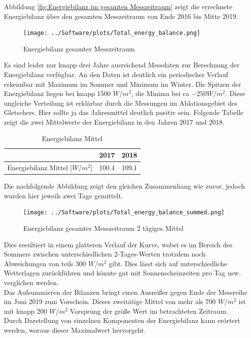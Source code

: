 \documentclass[12pt,a4paper]{article}
\begin{document}
Abbildung \ref{fig:Energiebilanz im gesamten Messzeitraum} zeigt die errechnete Energiebilanz über den gesamten Messzeitraum von Ende 2016 bis Mitte 2019. 

\begin{figure}[H]
\centering
\texttt{[image: ../Software/plots/Total\_energy\_balance.png]}
\caption{Energiebilanz gesamter Messzeitraum}
\label{fig:Energiebilanz gesamter Messzeitraum}
\end{figure}

Es sind leider nur knapp drei Jahre ausreichend Messdaten zur Berechnung der Energiebilanz verfügbar. An den Daten ist deutlich ein periodischer Verlauf erkennbar mit Maximum im Sommer und Minimum im Winter. Die Spitzen der Energiebilanz liegen bei knapp 1500 $W/m^2$, die Minima bei ca $-250 W/m^2$. Diese ungleiche Verteilung ist erklärbar durch die Messungen im Ablationsgebiet des Gletschers. Hier sollte ja das Jahresmittel deutlich positiv sein. Folgende Tabelle zeigt die zwei Mittelwerte der Energiebilanz in den Jahren 2017 und 2018.


\begin{table}[H]
\centering
{} 
\caption{Energiebilanz Mittel}
\label{tab:Energiebilanz Mittel}
\begin{tabular}{|l|l|l|}
\hline
                                                  & 2017  & 2018  \\ \hline
Energiebilanz Mittel [$W/m^2$] & 100.4 & 109.1 \\ \hline
\end{tabular}
\end{table}

Die nachfolgende Abbildung zeigt den gleichen Zusammenhang wie zuvor, jedoch wurden hier jeweils zwei Tage gemittelt.

\begin{figure}[H]
\centering
\texttt{[image: ../Software/plots/Total\_energy\_balance\_summed.png]}
\caption{Energiebilanz gesamter Messzeitraum 2 tägiges Mittel}
\label{fig:..}
\end{figure}

Dies resultiert in einem glatteren Verlauf der Kurve, wobei es im Bereich des Sommers zwischen unterschiedlichen 2-Tages-Werten trotzdem noch Abweichungen von teils 300 $W/m^2$ gibt. Dies lässt sich auf unterschiedliche Wetterlagen zurückführen und könnte gut mit Sonnenscheinzeiten pro Tag usw. verglichen werden.\\
Das Aufsummieren der Bilanzen bringt einen Ausreißer gegen Ende der Messreihe im Juni 2019 zum Vorschein. Dieses zweitätige Mittel von mehr als 700 $W/m^2$ ist mit knapp 200 $W/m^2$ Vorsprung der größe Wert im betrachteten Zeitraum. Durch Darstellung von einzelnen Komponenten der Energiebilanz kann erörtert werden, woraus dieser Maximalwert hervorgeht.\\
\end{document}
